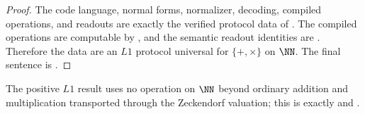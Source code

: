 \begin{proof}
The code language, normal forms, normalizer, decoding, compiled operations, and
readouts are exactly the verified protocol data of
.  The compiled operations are computable by
,
and the semantic readout identities are .  Therefore the
data are an \(L1\) protocol universal for \(\{+,\times\}\) on \(\NN\).  The final
sentence is .
\end{proof}

The positive \(L1\) result uses no operation on \(\NN\) beyond ordinary addition
and multiplication transported through the Zeckendorf valuation; this is exactly
 and .

